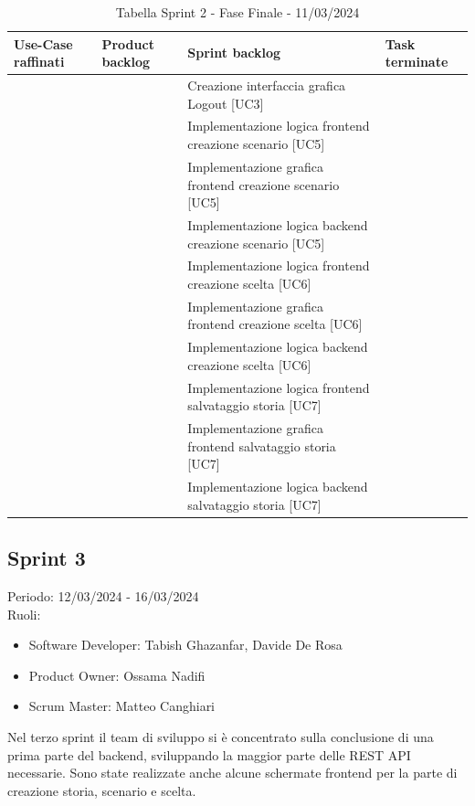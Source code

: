 \documentclass{article}
\begin{document}
\begin{table}[h]
    \centering
    \begin{tabularx}{\textwidth}{|X|X|X|X|}
        \hline
        \bf Use-Case raffinati & \bf Product backlog & \bf Sprint backlog & \bf Task terminate \\
        \hline
        & & Creazione interfaccia grafica Logout [UC3] & \\
        \hline
        & & Implementazione logica frontend creazione scenario [UC5] & \\
        \hline
        & & Implementazione grafica frontend creazione scenario [UC5] & \\
        \hline
        & & Implementazione logica backend creazione scenario [UC5] & \\
        \hline
        & & Implementazione logica frontend creazione scelta [UC6] & \\
        \hline
        & & Implementazione grafica frontend creazione scelta [UC6] & \\
        \hline
        & & Implementazione logica backend creazione scelta [UC6] & \\
        \hline
        & & Implementazione logica frontend salvataggio storia [UC7] & \\
        \hline
        & & Implementazione grafica frontend salvataggio storia [UC7] & \\
        \hline
        & & Implementazione logica backend salvataggio storia [UC7] & \\
        \hline
    \end{tabularx}
    \caption*{Tabella Sprint 2 - Fase Finale - 11/03/2024}
\end{table}

\clearpage
\subsection*{Sprint 3}
Periodo: 12/03/2024 - 16/03/2024\vspace*{7pt}\\
Ruoli:
\begin{itemize}[label = { }]
    \itemsep0em
    \item Software Developer: Tabish Ghazanfar, Davide De Rosa
    \item Product Owner: Ossama Nadifi 
    \item Scrum Master: Matteo Canghiari
\end{itemize}
Nel terzo sprint il team di sviluppo si è concentrato sulla conclusione di una prima parte del backend, sviluppando la maggior parte delle REST API necessarie. Sono state realizzate anche alcune schermate frontend per la parte di creazione storia, scenario e scelta.
\end{document}
